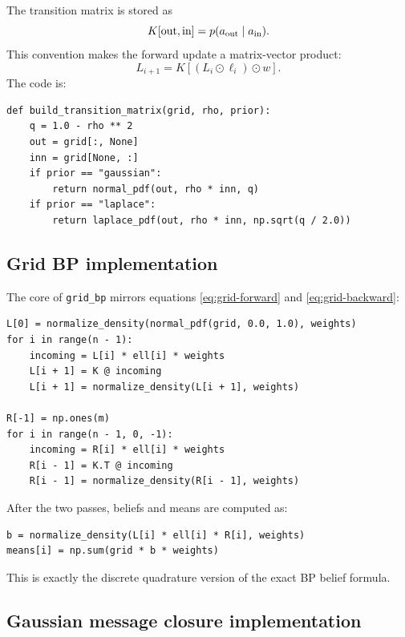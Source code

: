 \documentclass[11pt]{article}
\begin{document}
The transition matrix is stored as
\begin{equation}
  K[\text{out},\text{in}]=p(a_{\rm out}\mid a_{\rm in}).
\end{equation}
This convention makes the forward update a matrix-vector product:
\begin{equation}
  L_{i+1}=K\left[(L_i\odot \ell_i)\odot w\right].
\end{equation}
The code is:
\begin{lstlisting}[style=pythonstyle]
def build_transition_matrix(grid, rho, prior):
    q = 1.0 - rho ** 2
    out = grid[:, None]
    inn = grid[None, :]
    if prior == "gaussian":
        return normal_pdf(out, rho * inn, q)
    if prior == "laplace":
        return laplace_pdf(out, rho * inn, np.sqrt(q / 2.0))
\end{lstlisting}

\subsection{Grid BP implementation}

The core of \texttt{grid\_bp} mirrors equations \eqref{eq:grid-forward} and \eqref{eq:grid-backward}:
\begin{lstlisting}[style=pythonstyle]
L[0] = normalize_density(normal_pdf(grid, 0.0, 1.0), weights)
for i in range(n - 1):
    incoming = L[i] * ell[i] * weights
    L[i + 1] = K @ incoming
    L[i + 1] = normalize_density(L[i + 1], weights)

R[-1] = np.ones(m)
for i in range(n - 1, 0, -1):
    incoming = R[i] * ell[i] * weights
    R[i - 1] = K.T @ incoming
    R[i - 1] = normalize_density(R[i - 1], weights)
\end{lstlisting}
After the two passes, beliefs and means are computed as:
\begin{lstlisting}[style=pythonstyle]
b = normalize_density(L[i] * ell[i] * R[i], weights)
means[i] = np.sum(grid * b * weights)
\end{lstlisting}
This is exactly the discrete quadrature version of the exact BP belief formula.

\subsection{Gaussian message closure implementation}
\end{document}
